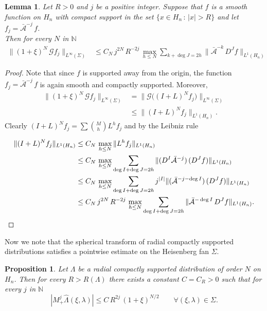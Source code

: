 \documentclass[12pt,a4paper]{amsart}
\theoremstyle{plain}
\newtheorem{lemma}[theorem]{Lemma}
\newtheorem{proposition}[theorem]{Proposition}
\theoremstyle{definition}
\numberwithin{equation}{section}
\begin{document}
 \begin{lemma}\label{lemmafj}
Let $R>0$ and $j$ be a positive integer.
 Suppose that $f$ is a smooth function on ${{H_{n}}}$
with compact support in the set $\{x\in {{H_{n}}}\,:\, |x|>R\}$
and let $f_j=\bar{\mathcal A}^{-j}\, f$.\\
Then for every $N$ in ${\mathbb N}$  
\begin{align*}
\|(1+\xi)^N\, {\mathcal G} f_j\|_{L^\infty({\Sigma})}
&\leq
 C_{N}\,j^{2N}\,R^{-2j}\, 
\max_{h\leq N}
\sum_{{k+\deg J=2h}}
\|{\bar{\mathcal A}}^{-k}\,{{D}}^{J} f\|_{L^1({{H_{n}}})}
\end{align*}
\end{lemma}
 \begin{proof} Note that since $f$ is supported away from the origin,
the function $f_j= \bar{\mathcal A}^{-j}\,f$ is again smooth and compactly supported.
Moreover,
\begin{align*}
\|(1+\xi)^{N}\,{\mathcal G}{f_j}\|_{L^{\infty}({\Sigma})}
&= 
\|{\mathcal G}\bigl({(I+L)^{N}f_j}\bigr)\|_{{L^{\infty}({\Sigma})}}
\\
&\leq 
\|(I+L)^Nf_j \|_{L^1({{H_{n}}})}
.
\end{align*}
Clearly $(I+L)^Nf_j=\sum\binom{M}{h}L^hf_j$ and
by the Leibniz rule
  
\begin{align*}
\|(I+L)^Nf_j \|_{L^1({{H_{n}}})}
&
\leq C_N \,\max_{h\leq N}\|L^hf_j\|_{L^1({{H_{n}}})}
\\
&\leq C_N\,
\max_{h\leq N}
\sum_{{\deg I+\deg J=2h}}
\|({{D}}^I {\bar{\mathcal A}}^{-j})\,({{D}}^{J} f) \|_{L^1({{H_{n}}})}
\\
&\leq C_N\,
\max_{h\leq N}
\sum_{{\deg I+\deg J=2h}} j^{|I|}
\|({\bar{\mathcal A}}^{-j-\deg I})\,({{D}}^{J} f) \|_{L^1({{H_{n}}})}
\\
&\leq C_N\,j^{2N}\,R^{-2j}\, 
\max_{h\leq N}
\sum_{{\deg I+\deg J=2h}}
\|{\bar{\mathcal A}}^{-\deg I}\,{{D}}^{J} f\|_{L^1({{H_{n}}})}.
\qedhere
\end{align*}
\end{proof}

Now we note that the spherical transform of radial compactly supported distributions
satisfies a pointwise estimate on the Heisenberg fan ${\Sigma}$.

\begin{proposition}
\label{puntuale}
Let $\Lambda$ be a radial compactly supported distribution of order $N$ on ${{H_{n}}}$. Then for every    $R>R(\Lambda)$
there exists a constant $C=C_R>0$ 
 such that for every $j$ in ${\mathbb N}$
  \begin{equation}\label{claim}
|M_+^j \widehat \Lambda(\xi,{\lambda})|\leq C\,  
 R^{2j}\, (1+\xi)^{N/2}
\qquad
\forall (\xi,{\lambda})\in{\Sigma} .
\end{equation}
\end{proposition}
\end{document}

